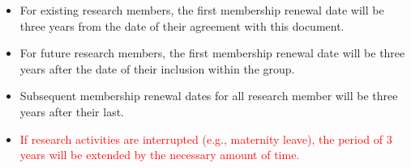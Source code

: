 \documentclass[a4paper, 11pt]{scrartcl}
\begin{document}
\begin{itemize}

\item For existing research members, the first membership renewal date will be three years from the date of their agreement with this document. 
\item For future research members, the first membership renewal date will be three years after the date of their inclusion within the group. 
\item Subsequent membership renewal dates for all research member will be three years after their last.
\item \textcolor{red}{If research activities are interrupted (e.g., maternity leave), the period of 3 years will be extended by the necessary amount of time.}
\end{itemize}
\end{document}

